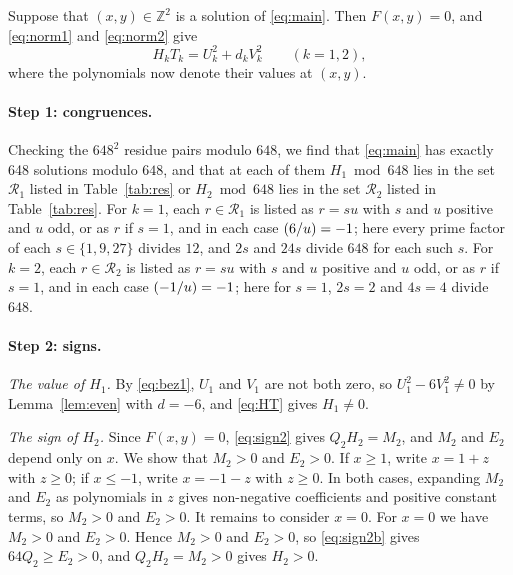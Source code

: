 \documentclass[11pt]{article}
\newcommand{\Z}{\mathbb{Z}}
\newcommand{\leg}[2]{\mathchoice{\biggl(\dfrac{#1}{#2}\biggr)}{(#1/#2)}{(#1/#2)}{(#1/#2)}}
\begin{document}
Suppose that $(x,y)\in\Z^2$ is a solution of \eqref{eq:main}. Then $F(x,y)=0$, and \eqref{eq:norm1} and \eqref{eq:norm2} give
\begin{equation}\label{eq:HT}
H_kT_k=U_k^2+d_kV_k^2\qquad(k=1,2),
\end{equation}
where the polynomials now denote their values at $(x,y)$.

\paragraph{Step 1: congruences.} Checking the $648^2$ residue pairs modulo $648$, we find that \eqref{eq:main} has exactly 648 solutions modulo $648$, and that at each of them $H_{1}\bmod 648$ lies in the set $\mathcal R_{1}$ listed in Table~\ref{tab:res} or $H_{2}\bmod 648$ lies in the set $\mathcal R_{2}$ listed in Table~\ref{tab:res}. For $k=1$, each $r\in\mathcal R_{1}$ is listed as $r=su$ with $s$ and $u$ positive and $u$ odd, or as $r$ if $s=1$, and in each case $\leg{6}{u}=-1$; here every prime factor of each $s\in\{1,9,27\}$ divides $12$, and $2s$ and $24s$ divide $648$ for each such $s$. For $k=2$, each $r\in\mathcal R_{2}$ is listed as $r=su$ with $s$ and $u$ positive and $u$ odd, or as $r$ if $s=1$, and in each case $\leg{-1}{u}=-1$; here for $s=1$, $2s=2$ and $4s=4$ divide $648$.

\paragraph{Step 2: signs.} \emph{The value of $H_{1}$.} By \eqref{eq:bez1}, $U_{1}$ and $V_{1}$ are not both zero, so $U_{1}^2-6V_{1}^2\neq0$ by Lemma~\ref{lem:even} with $d=-6$, and \eqref{eq:HT} gives $H_{1}\neq0$.

\emph{The sign of $H_{2}$.} Since $F(x,y)=0$, \eqref{eq:sign2} gives $Q_{2}H_{2}=M_{2}$, and $M_{2}$ and $E_{2}$ depend only on $x$. We show that $M_{2}>0$ and $E_{2}>0$. If $x\geq1$, write $x=1+z$ with $z\geq0$; if $x\leq-1$, write $x=-1-z$ with $z\geq0$. In both cases, expanding $M_{2}$ and $E_{2}$ as polynomials in $z$ gives non-negative coefficients and positive constant terms, so $M_{2}>0$ and $E_{2}>0$. It remains to consider $x=0$. For $x=0$ we have $M_{2}>0$ and $E_{2}>0$. Hence $M_{2}>0$ and $E_{2}>0$, so \eqref{eq:sign2b} gives $64Q_{2}\geq E_{2}>0$, and $Q_{2}H_{2}=M_{2}>0$ gives $H_{2}>0$.
\end{document}

